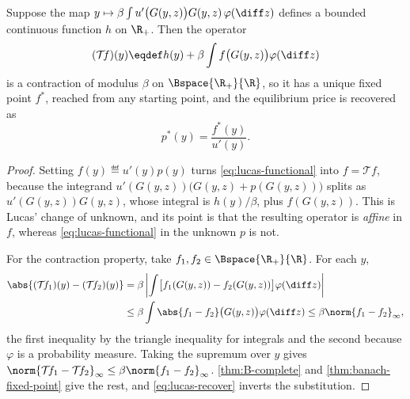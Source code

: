 \begin{theorem}\label{thm:lucas-contraction}
	Suppose the map
	$y\mapsto\beta\int u'\bigl(G(y,z)\bigr)G(y,z)\,\varphi(\diff z)$
	defines a bounded continuous function $h$ on $\R_+$. Then the operator
	\begin{equation}\label{eq:lucas-T}
		(\mathcal{T}\!f)(y)\eqdef h(y)+\beta\int f\bigl(G(y,z)\bigr)\varphi(\diff z)
	\end{equation}
	is a contraction of modulus $\beta$ on $\Bspace{\R_+}{\R}$, so it has a unique
	fixed point $f^{\ast}$, reached from any starting point, and the equilibrium
	price is recovered as
	\begin{equation}\label{eq:lucas-recover}
		p^{\ast}(y)=\frac{f^{\ast}(y)}{u'(y)} .
	\end{equation}
\end{theorem}

\begin{proof}
	Setting $f(y)\eqdef u'(y)p(y)$ turns \eqref{eq:lucas-functional} into
	$f=\mathcal{T}\!f$, because the integrand
	$u'(G(y,z))\bigl(G(y,z)+p(G(y,z))\bigr)$ splits as
	$u'(G(y,z))G(y,z)$, whose integral is $h(y)/\beta$, plus $f(G(y,z))$. This is
	Lucas' change of unknown, and its point is that the resulting operator is
	\emph{affine} in $f$, whereas \eqref{eq:lucas-functional} in the unknown $p$ is
	not.

	For the contraction property, take $f_1,f_2\in\Bspace{\R_+}{\R}$. For each $y$,
	\begin{align*}
		\abs{(\mathcal{T}\!f_1)(y)-(\mathcal{T}\!f_2)(y)}
		 & =\beta\left|\int\bigl[f_1(G(y,z))-f_2(G(y,z))\bigr]\varphi(\diff z)\right| \\
		 & \leq\beta\int\abs{f_1-f_2}\bigl(G(y,z)\bigr)\varphi(\diff z)
		\leq\beta\norm{f_1-f_2}_\infty,
	\end{align*}
	the first inequality by the triangle inequality for integrals and the second
	because $\varphi$ is a probability measure. Taking the supremum over $y$ gives
	$\norm{\mathcal{T}\!f_1-\mathcal{T}\!f_2}_\infty\leq\beta\norm{f_1-f_2}_\infty$.
	\autoref{thm:B-complete} and \autoref{thm:banach-fixed-point} give the rest, and
	\eqref{eq:lucas-recover} inverts the substitution.
\end{proof}

